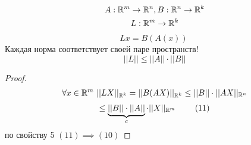 \documentclass[main]{subfiles}
\begin{document}
    \begin{theorem}
    \begin{gather*}
        A : {\mathbb{R}}^m \rightarrow {\mathbb{R}}^n, B: {\mathbb{R}}^n \rightarrow {\mathbb{R}}^k \\
        L: {\mathbb{R}}^m \rightarrow {\mathbb{R}}^k \\
    \end{gather*}
        \[Lx = B(A(x))\ \tag{10} \]
        Каждая норма соответствует своей паре пространств! 
        \[||L|| \leq ||A|| \cdot ||B||\]

    \end{theorem}
    \begin{proof}
        \begin{gather*}
            \forall x \in {\mathbb{R}}^m \text{  }||LX||_{{\mathbb{R}}^k} = ||B(AX)||_{{\mathbb{R}}^k}
        \leq ||B|| \cdot ||AX||_{{\mathbb{R}}^n} 
        \end{gather*}
        \[\leq \underbrace{||B|| \cdot ||A||}_{c}
         \cdot ||X||_{{\mathbb{R}}^m}\   \tag{11} \]
        по свойству 5 $(11) \implies (10)$
    \end{proof}
\end{document}
